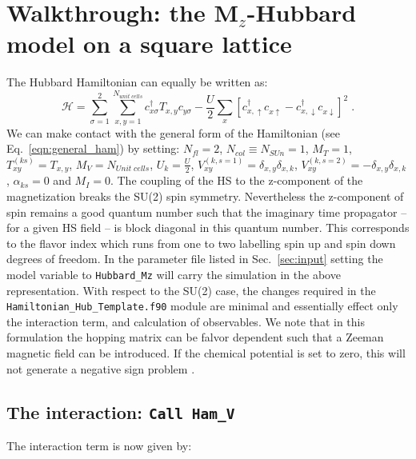 \section{Walkthrough: the M$_z$-Hubbard model on a square lattice}\label{sec:walk1.1}

The Hubbard Hamiltonian can equally be written as:
\begin{equation}
\label{eqn_hubbard_Mz}
\mathcal{H}=
\sum\limits_{\sigma=1}^{2} 
\sum\limits_{x,y =1 }^{N_{unit\; cells }} 
  c^{\dagger}_{x \sigma} T_{x,y}c^{\phantom\dagger}_{y \sigma} 
- \frac{U}{2}\sum\limits_{x}\left[
c^{\dagger}_{x, \uparrow} c^{\phantom\dagger}_{x \uparrow}  -   c^{\dagger}_{x, \downarrow} c^{\phantom\dagger}_{x \downarrow}  \right]^{2}\;.
\end{equation} 
We can make contact with the general form of the Hamiltonian  (see Eq.~\ref{eqn:general_ham}) by setting: 
$N_{fl} = 2$, $N_{col} \equiv N_{SUn}     =1 $,   $M_T    =    1$,  $T^{(ks)}_{x y}   =  T_{x,y}$,  $M_V   =  N_{Unit\; cells} $,  $U_{k}       =   \frac{U}{2}$, 
 $V_{x y}^{(k, s=1)} =  \delta_{x,y} \delta_{x,k}  $,  $V_{x y}^{(k, s=2)} =  - \delta_{x,y} \delta_{x,k}  $,  $\alpha_{ks}   = 0  $ and $M_I       = 0 $.   The coupling of the HS  to the z-component of   the magnetization breaks the SU(2) spin symmetry. Nevertheless the z-component of spin remains a good quantum number such that  the imaginary time propagator -- for a given HS field -- is block  diagonal in this quantum number. This corresponds to the flavor index  which runs from one to two  labelling spin up and spin down  degrees of freedom.       In the parameter file  listed in  Sec.~\ref{sec:input}  setting the model variable to  \texttt{Hubbard\_Mz}  will carry the simulation in the above representation.   With respect to the SU(2) case, the changes required in the \texttt{Hamiltonian\_Hub\_Template.f90}   module are  minimal and essentially effect only the interaction term, and calculation of observables.  We note that  in this formulation the  hopping matrix can be falvor dependent such that a Zeeman  magnetic field can be introduced.  If the chemical potential is set to zero, this will not generate a negative sign problem \cite{??}.    
 \subsection{The interaction: \texttt{Call Ham\_V} } 
The interaction term is now given by: 

